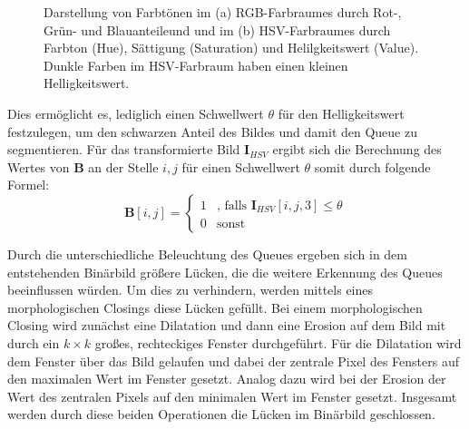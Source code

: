\begin{figure}[H]
	\label{fig:HSVRGB}
	\centering
	\caption{Darstellung von Farbtönen im (a) RGB-Farbraumes durch Rot-, Grün- und Blauanteileund und  im (b) HSV-Farbraumes durch Farbton (Hue), Sättigung (Saturation) und Helilgkeitswert (Value). Dunkle Farben im HSV-Farbraum haben einen kleinen Helligkeitswert.}
\end{figure}

Dies ermöglicht es, lediglich einen Schwellwert $\theta$ für den Helligkeitswert festzulegen, um den schwarzen Anteil des Bildes und damit den Queue zu segmentieren. 
Für das transformierte Bild $\textbf{I}_{HSV}$ ergibt sich die Berechnung des Wertes von $\textbf{B}$ an der Stelle $i, j$ für einen Schwellwert $\theta$ somit durch folgende Formel:
\begin{equation*}
\textbf{B}[i,j] = \begin{cases}
1 &\text{, falls $\textbf{I}_{HSV}[i, j, 3] \leq \theta$}\\
0 &\text{sonst}
\end{cases}
\end{equation*}

Durch die unterschiedliche Beleuchtung des Queues ergeben sich in dem entstehenden Binärbild größere Lücken, die die weitere Erkennung des Queues beeinflussen würden.
Um dies zu verhindern, werden mittels eines morphologischen Closings diese Lücken gefüllt.
Bei einem morphologischen Closing wird zunächst eine Dilatation und dann eine Erosion auf dem Bild mit durch ein $k \times k$ großes, rechteckiges Fenster durchgeführt. 
Für die Dilatation wird dem Fenster über das Bild gelaufen und dabei der zentrale Pixel des Fensters auf den maximalen Wert im Fenster gesetzt.
Analog dazu wird bei der Erosion der Wert des zentralen Pixels auf den minimalen Wert im Fenster gesetzt.
Insgesamt werden durch diese beiden Operationen die Lücken im Binärbild geschlossen.

